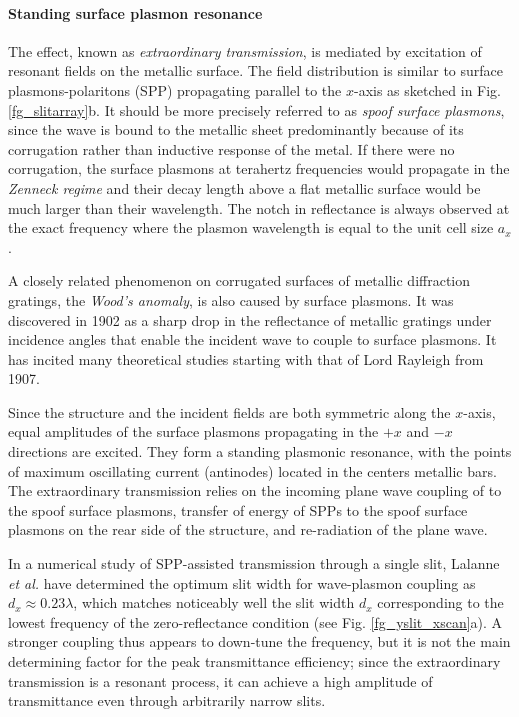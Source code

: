 \paragraph{Standing surface plasmon resonance} %
The effect, known as \textit{extraordinary transmission}, is mediated by excitation of resonant fields on the metallic surface. 
The field distribution is similar to surface plasmons-polaritons (SPP) propagating parallel to the $x$-axis as sketched in Fig. \ref{fg_slitarray}b. It should be more precisely referred to as \textit{spoof surface plasmons}, since the wave is bound to the metallic sheet predominantly because of its corrugation rather than inductive response of the metal. If there were no corrugation, the surface plasmons at terahertz frequencies would propagate in the \textit{Zenneck regime} \cite{navarro-cia2013terahertz} and their decay length above a flat metallic surface would be much larger than their wavelength. 
The notch in reflectance is always observed at the exact frequency where the plasmon wavelength is equal to the unit cell size $a_x$.

A closely related phenomenon  on corrugated surfaces of metallic diffraction gratings, the \textit{Wood's anomaly}, is also caused by surface plasmons. It was discovered in 1902 as a sharp drop in the reflectance of metallic gratings \cite{wood1902remarkable} under incidence angles that enable the incident wave to couple to surface plasmons. It has incited many theoretical studies starting with that of Lord Rayleigh \cite{rayleigh1907dynamical} from 1907.  %

Since the structure and the incident fields are both symmetric along the $x$-axis, equal amplitudes of the surface plasmons propagating in the $+x$ and $-x$ directions are excited. They form a standing plasmonic resonance, with the points of maximum oscillating current (antinodes) located in the centers metallic bars. The extraordinary transmission relies on the incoming plane wave coupling of to the spoof surface plasmons, transfer of energy of SPPs to the spoof surface plasmons on the rear side of the structure, and re-radiation of the plane wave. 

In a numerical study of SPP-assisted transmission through a single slit, Lalanne \textit{et al.} have determined \cite{lalanne2005theory} the optimum slit width for wave-plasmon coupling as $d_x \approx 0.23 \lambda$, which matches noticeably well the slit width $d_x$ corresponding to the lowest frequency of the zero-reflectance condition  (see Fig. \ref{fg_yslit_xscan}a). A stronger coupling thus appears to down-tune the frequency, but it is not the main determining factor for the peak transmittance efficiency; since the extraordinary transmission is a resonant process, it can achieve a high amplitude of transmittance even through arbitrarily narrow slits. 

